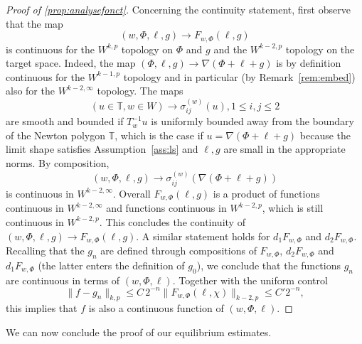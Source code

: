 \documentclass[AHL,Unicode,longabstracts,published]{cedram}
\newcommand{\bbT}{\mathbb{T}}
\newcommand{\norm}[1]{\lVert #1 \rVert}
\begin{document}
\begin{proof}[Proof of \cref{prop:analysefonct}]
Concerning the continuity statement, first observe that the map
\begin{equation}
(w,
\Phi, \ell, g) \to F_{w, \Phi}(\ell, g)
\end{equation}
is continuous for the $W^{k, p}$ topology on $\Phi$ and $g$ and the $W^{k-2, p} $ topology on the target space. Indeed, the map $(\Phi, \ell, g) \to \nabla (\Phi + \ell + g)$ is by definition continuous for the $W^{k-1, p}$ topology and in particular (by Remark~\ref{rem:embed}) also for the $W^{k-2, \infty}$ topology. The maps
\begin{equation}
(u\in \bbT, w\in W) \to \sigma_{ij}^{(w)}(u), 1\le i,j\le 2
\end{equation}
are smooth and bounded if $T_w^{-1}u$ is uniformly bounded away from the boundary of the Newton polygon $\bbT$, which is the case if $u=\nabla(\Phi+\ell+g)$ because the limit shape satisfies
Assumption~\ref{ass:ls} and $\ell,g$ are small in the appropriate norms. By composition,
\begin{equation}
(w, \Phi, \ell, g) \to \sigma_{ij}^{(w)}(\nabla (\Phi+\ell+g))
\end{equation}
is continuous in $W^{k-2, \infty}$. Overall $F_{w, \Phi}(\ell, g)$ is a product of functions continuous in $W^{k-2, \infty}$ and functions continuous in $W^{k-2, p}$, which is still continuous in $W^{k-2, p}$. This concludes the continuity of $(w,
\Phi, \ell, g) \to F_{w, \Phi}(\ell, g)$. A similar statement holds for $d_1 F_{w, \Phi}$ and $d_2 F_{w, \Phi}$. Recalling that the $g_n$ are defined through compositions of $F_{w,\Phi}$, $d_2F_{w,\Phi}$ and $d_1 F_{w,\Phi}$ (the latter enters the definition of $g_0$), we conclude that the functions $g_n$ are continuous in terms of $(w,
\Phi, \ell)$. Together with the uniform control
\begin{equation}
\norm{f - g_n }_{k,p}
\leq C\,2^{-n} \norm{F_{w,\Phi}(\ell, \chi)}_{k-2,p}\le C' 2^{-n},
\end{equation}
this implies that $f$ is also a continuous function of $(w, \Phi,
\ell)$.
\end{proof}



We can now conclude the proof of our equilibrium estimates.
\end{document}
